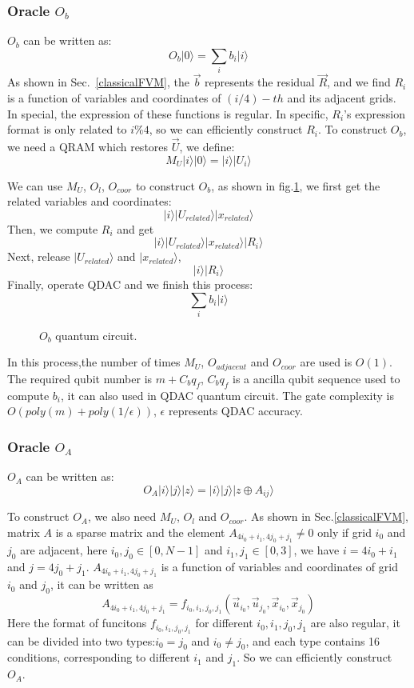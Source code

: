 \documentclass[%
 reprint,
 amsmath,amssymb,
pra,
]{revtex4-1}
\begin{document}
\subsubsection{Oracle $O_b$}
$O_b$ can be written as:
$$
O_b|0\rangle=\sum_i{b_i|i\rangle}
$$
As shown in Sec.~\ref{classicalFVM}, the $\vec{b}$ represents the residual $\vec{R}$, and we find $R_i$ is a function of variables and coordinates of $(i/4)-th$ and its adjacent grids. In special, the expression of these functions is regular. In specific, $R_i$'s expression format is only related to $i\%4$, so we can efficiently construct $R_i$. To construct $O_b$, we need a QRAM which restores $\vec{U}$, we define:
$$
M_U|i\rangle|0\rangle=|i\rangle|U_i\rangle
$$

We can use $M_U$, $O_l$, $O_{coor}$ to construct $O_b$, as shown in fig.\ref{OB}, we first get the related variables and coordinates:
$$
|i\rangle|U_{related}\rangle|x_{related}\rangle
$$
Then, we compute $R_i$ and get
$$
|i\rangle|U_{related}\rangle|x_{related}\rangle|R_i\rangle
$$
Next, release $|U_{related}\rangle$ and $|x_{related}\rangle$,
$$
|i\rangle|R_i\rangle
$$
Finally, operate QDAC and we finish this process:
$$
\sum_i{b_i|i\rangle}
$$

\begin{figure}[htbp]
    \caption{$O_b$ quantum circuit. }
    \label{OB}
\end{figure}

In this process,the number of times $M_U$, $O_{adjacent}$ and $O_{coor}$ are used is $O(1)$. The required qubit number is $m+C_bq_f$, $C_bq_f$ is a ancilla qubit sequence used to compute $b_i$, it can also used in QDAC quantum circuit. The gate complexity is $O(poly(m)+poly(1/\epsilon))$, $\epsilon$ represents QDAC accuracy.


\subsubsection{Oracle $O_A$}
$O_A$ can be written as:
$$
O_A|i\rangle|j\rangle|z\rangle=|i\rangle|j\rangle|z\oplus A_{ij}\rangle
$$

To construct $O_A$, we also need $M_U$, $O_l$ and $O_{coor}$. As shown in Sec.\ref{classicalFVM}, matrix $A$ is a sparse matrix and the element $A_{4i_0+i_1,4j_0+j_1}\neq0$ only if grid $i_0$ and $j_0$ are adjacent, here $i_0,j_0\in[0,N-1]$ and $i_1,j_1\in[0,3]$, we have $i=4i_0+i_1$ and $j=4j_0+j_1$. $A_{4i_0+i_1,4j_0+j_1}$ is a function of variables and coordinates of grid $i_0$ and $j_0$, it can be written as
$$
A_{4i_0+i_1,4j_0+j_1}=f_{i_0,i_1,j_0,j_1}(\vec{u}_{i_0},\vec{u}_{j_0},\vec{x}_{i_0},\vec{x}_{j_0})
$$
Here the format of funcitons $f_{i_0,i_1,j_0,j_1}$ for different $i_0,i_1,j_0,j_1$ are also regular, it can be divided into two types:$i_0=j_0$ and $i_0\neq j_0$, and each type contains 16 conditions, corresponding to different $i_1$ and $j_1$. So we can efficiently construct $O_A$.
\end{document}
